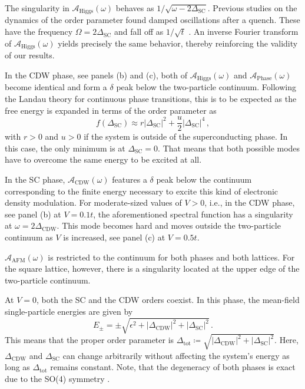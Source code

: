\documentclass[
    reprint, 
    aps,
    preprintnumbers,
    twocolumn,
    prb,
    superscriptaddress
]{revtex4-2}
\newcommand{\spectral}[1]{\mathcal{A}_\text{#1}  (\omega)}
\begin{document}
The singularity in $\spectral{Higgs}$ behaves as $1/\sqrt{\omega - 2 \Delta_\text{SC}}$.
Previous studies on the dynamics of the order parameter found damped oscillations after a quench.
These have the frequency $\Omega = 2 \Delta_\text{SC}$ and fall off as $1/\sqrt{t}$ \cite{Yuzbashyan06}.
An inverse Fourier transform of $\spectral{Higgs}$ yields precisely the same behavior, thereby reinforcing the validity of our results.

In the CDW phase, see panels (b) and (c), both of $\spectral{Higgs}$ and $\spectral{Phase}$ become identical and form a $\delta$ peak below the two-particle continuum.
Following the Landau theory for continuous phase transitions, this is to be expected as the free energy is expanded in terms of the order parameter as
\begin{equation}
    f(\Delta_\text{SC}) \approx r |\Delta_\text{SC}|^2 + \frac{u}{2} |\Delta_\text{SC}|^4\,,
\end{equation}
with $r > 0$ and $u > 0$ if the system is outside of the superconducting phase. 
In this case, the only minimum is at $\Delta_\text{SC} = 0$. 
That means that both possible modes have to overcome the same energy to be excited at all. 

In the SC phase, $\spectral{CDW}$ features a $\delta$ peak below the continuum corresponding to the finite energy necessary to excite this kind of electronic density modulation.
For moderate-sized values of $V>0$, i.e., in the CDW phase, see panel (b) at $V=0.1t$, the aforementioned spectral function has a singularity at $\omega=2\Delta_\text{CDW}$.%
This mode becomes hard and moves outside the two-particle continuum as $V$ is increased, see panel (c) at $V=0.5t$.

$\spectral{AFM}$ is restricted to the continuum for both phases and both lattices.
For the square lattice, however, there is a singularity located at the upper edge of the two-particle continuum.


At $V=0$, both the SC and the CDW orders coexist. 
In this phase, the mean-field single-particle energies are given by
\begin{equation}
    E_{\pm} = \pm \sqrt{\epsilon^2 + |\Delta_\text{CDW}|^2 + |\Delta_\text{SC}|^2}\,.
\end{equation}
This means that the proper order parameter is $\Delta_\text{tot} \coloneqq \sqrt{|\Delta_\text{CDW}|^2 + |\Delta_\text{SC}|^2}$.
Here, $\Delta_\text{CDW}$ and $\Delta_\text{SC}$ can change arbitrarily without affecting the system's energy as long as $\Delta_\text{tot}$ remains constant.
Note, that the degeneracy of both phases is exact due to the SO(4) symmetry \cite{yang90}. 
\end{document}

